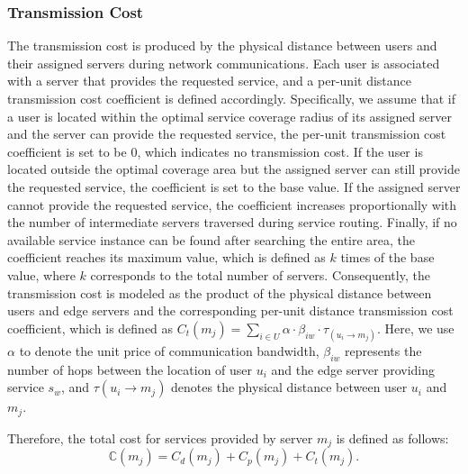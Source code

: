 \documentclass[10pt, conference, letterpaper]{IEEEtran}
\begin{document}
\subsubsection{Transmission Cost}
The transmission cost is produced by the physical distance between users and their assigned servers during network communications. Each user is associated with a server that provides the requested service, and a per-unit distance transmission cost coefficient is defined accordingly. Specifically, we assume that if a user is located within the optimal service coverage radius of its assigned server and the server can provide the requested service, the per-unit transmission cost coefficient is set to be $0$, which indicates no transmission cost. If the user is located outside the optimal coverage area but the assigned server can still provide the requested service, the coefficient is set to the base value. If the assigned server cannot provide the requested service, the coefficient increases proportionally with the number of intermediate servers traversed during service routing. Finally, if no available service instance can be found after searching the entire area, the coefficient reaches its maximum value, which is defined as $k$ times of the base value, where $k$ corresponds to the total number of servers. Consequently, the transmission cost is modeled as the product of the physical distance between users and edge servers and the corresponding per-unit distance transmission cost coefficient, which is defined as $C_{t}(m_j) = \sum_{i \in U} \alpha\cdot \beta_{iw}\cdot\tau_{(u_i \rightarrow m_j)}$. Here, we use $\alpha$ to denote the unit price of communication bandwidth, $\beta_{iw}$ represents the number of hops between the location of user $u_i$ and the edge server providing service $s_w$, and $\tau(u_i \rightarrow m_j)$ denotes the physical distance between user $u_i$ and $m_j$.

Therefore, the total cost for services provided by server $m_j$ is defined as follows: 
\begin{equation}
\mathbb{C}(m_j) = C_{d}(m_j) + C_{p}(m_j) + C_{t}(m_j).
	 \label{eq1}
\end{equation}

\end{document}
